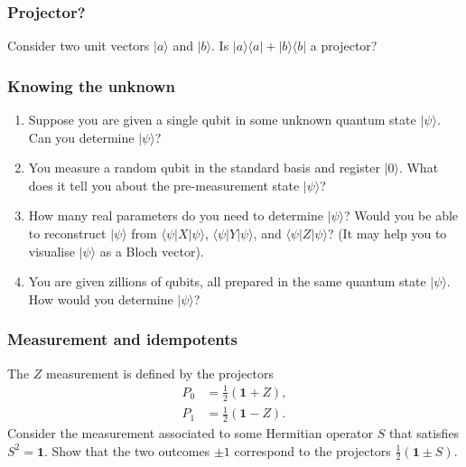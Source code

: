 \documentclass[fleqn]{article}
\begin{document}
\hypertarget{projector}{%
\subsubsection{Projector?}\label{projector}}

Consider two unit vectors \(|a\rangle\) and \(|b\rangle\).
Is \(|a\rangle\langle a|+|b\rangle\langle b|\) a projector?

\hypertarget{knowing-the-unknown}{%
\subsubsection{Knowing the unknown}\label{knowing-the-unknown}}

\begin{enumerate}
\def\labelenumi{\arabic{enumi}.}
\item
  Suppose you are given a single qubit in some unknown quantum state \(|\psi\rangle\).
  Can you determine \(|\psi\rangle\)?
\item
  You measure a random qubit in the standard basis and register \(|0\rangle\).
  What does it tell you about the pre-measurement state \(|\psi\rangle\)?
\item
  How many real parameters do you need to determine \(|\psi\rangle\)?
  Would you be able to reconstruct \(|\psi\rangle\) from \(\langle\psi|X|\psi\rangle\), \(\langle\psi|Y|\psi\rangle\), and \(\langle\psi|Z|\psi\rangle\)?
  (It may help you to visualise \(|\psi\rangle\) as a Bloch vector).
\item
  You are given zillions of qubits, all prepared in the same quantum state \(|\psi\rangle\).
  How would you determine \(|\psi\rangle\)?
\end{enumerate}

\hypertarget{measurement-and-idempotents}{%
\subsubsection{Measurement and idempotents}\label{measurement-and-idempotents}}

The \(Z\) measurement is defined by the projectors
\[
  \begin{aligned}
    P_0 &= \frac12(\mathbf{1}+ Z),
  \\P_1 &= \frac12(\mathbf{1}- Z).
  \end{aligned}
\]
Consider the measurement associated to some Hermitian operator \(S\) that satisfies \(S^2=\mathbf{1}\).
Show that the two outcomes \(\pm 1\) correspond to the projectors \(\frac12(\mathbf{1}\pm S)\).
\end{document}
